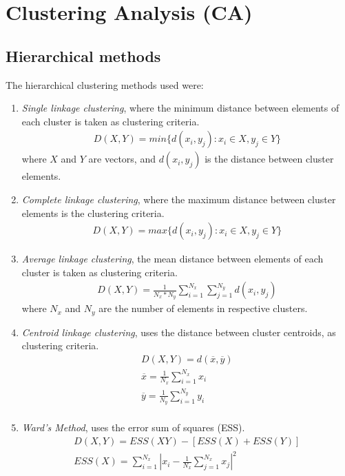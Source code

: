 \chapter{Clustering Analysis (CA)} 
%
\label{appendix_a}

\section{Hierarchical methods}
The hierarchical clustering methods used were:

\begin{enumerate}
\item{
\textit{Single linkage clustering}, where the minimum distance between
elements of each cluster is taken as clustering criteria.
\begin{gather}
D(X, Y)=min\{d(x_i, y_j): x_i \in X, y_j \in Y \}
\end{gather}
where $X$ and $Y$ are vectors, and $d(x_i, y_j)$ is the distance
between cluster elements.
}

\item{
\textit{Complete linkage clustering}, where the maximum distance between
cluster elements is the clustering criteria.
\begin{gather}
D(X, Y)=max\{d(x_i, y_j): x_i \in X, y_j \in Y \}
\end{gather}
}

\item{
\textit{Average linkage clustering}, the mean distance between elements of
each cluster is taken as clustering criteria.
\begin{gather}
D(X, Y)=\frac{1}{N_x * N_y} \sum_{i=1}^{N_x} \sum_{j=1}^{N_y} d(x_i, y_j)
\end{gather}
where $N_x$ and $N_y$ are the number of elements in respective clusters.
}

\item{
\textit{Centroid linkage clustering}, uses the distance between cluster
centroids, as clustering criteria.
\begin{gather}
D(X, Y)=d(\overline{x}, \overline{y})\\
\overline{x} = \frac{1}{N_x} \sum_{i=1}^{N_x} x_i\\
\overline{y} = \frac{1}{N_y} \sum_{i=1}^{N_y} y_i\\
\end{gather}
}

\item{
\textit{Ward's Method}, uses the error sum of squares (ESS).
\begin{gather}
D(X,Y)=ESS(XY) -[ESS(X) + ESS(Y)]\\
ESS(X)= \sum_{i=1}^{N_x} \left| x_i -\frac{1}{N_x}\sum_{j=1}^{N_x} x_j\right|^2
\end{gather}
}
\end{enumerate}




